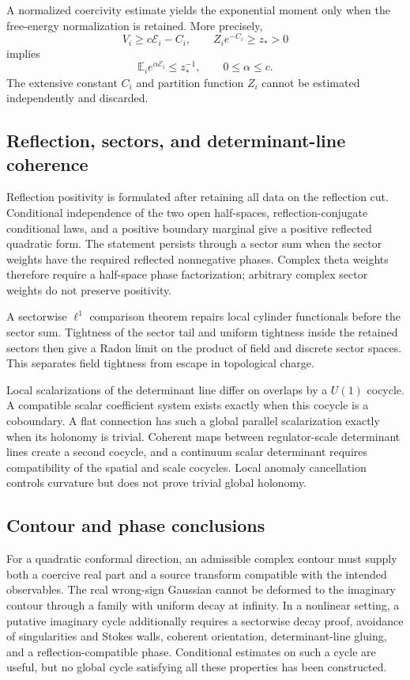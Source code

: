 \documentclass[11pt]{article}
\begin{document}
A normalized coercivity estimate yields the exponential moment only when
the free-energy normalization is retained.  More precisely,
\[
 V_i\geq c\mathcal E_i-C_i,\qquad Z_i e^{-C_i}\geq z_*>0
\]
implies
\[
 \mathbb E_i e^{\alpha\mathcal E_i}\leq z_*^{-1},
 \qquad 0\leq\alpha\leq c.
\]
The extensive constant \(C_i\) and partition function \(Z_i\) cannot be
estimated independently and discarded.

\subsection{Reflection, sectors, and determinant-line coherence}

Reflection positivity is formulated after retaining all data on the
reflection cut.  Conditional independence of the two open half-spaces,
reflection-conjugate conditional laws, and a positive boundary marginal
give a positive reflected quadratic form.  The statement persists through
a sector sum when the sector weights have the required reflected
nonnegative phases.  Complex theta weights therefore require a
half-space phase factorization; arbitrary complex sector weights do not
preserve positivity.

A sectorwise \(\ell^1\) comparison theorem repairs local cylinder
functionals before the sector sum.  Tightness of the sector tail and
uniform tightness inside the retained sectors then give a Radon limit on
the product of field and discrete sector spaces.  This separates
field tightness from escape in topological charge.

Local scalarizations of the determinant line differ on overlaps by a
\(U(1)\) cocycle.  A compatible scalar coefficient system exists exactly
when this cocycle is a coboundary.  A flat connection has such a global
parallel scalarization exactly when its holonomy is trivial.  Coherent
maps between regulator-scale determinant lines create a second cocycle,
and a continuum scalar determinant requires compatibility of the spatial
and scale cocycles.  Local anomaly cancellation controls curvature but
does not prove trivial global holonomy.

\subsection{Contour and phase conclusions}

For a quadratic conformal direction, an admissible complex contour must
supply both a coercive real part and a source transform compatible with
the intended observables.  The real wrong-sign Gaussian cannot be deformed
to the imaginary contour through a family with uniform decay at infinity.
In a nonlinear setting, a putative imaginary cycle additionally requires
a sectorwise decay proof, avoidance of singularities and Stokes walls,
coherent orientation, determinant-line gluing, and a reflection-compatible
phase.  Conditional estimates on such a cycle are useful, but no global
cycle satisfying all these properties has been constructed.
\end{document}
